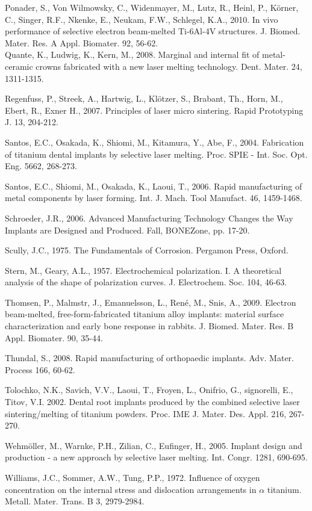 \documentclass[10pt]{article}
\begin{document}
Ponader, S., Von Wilmowsky, C., Widenmayer, M., Lutz, R., Heinl, P., Körner, C., Singer, R.F., Nkenke, E., Neukam, F.W., Schlegel, K.A., 2010. In vivo performance of selective electron beam-melted Ti-6Al-4V structures. J. Biomed. Mater. Res. A Appl. Biomater. 92, 56-62.\\
Quante, K., Ludwig, K., Kern, M., 2008. Marginal and internal fit of metal-ceramic crowns fabricated with a new laser melting technology. Dent. Mater. 24, 1311-1315.

Regenfuss, P., Streek, A., Hartwig, L., Klötzer, S., Brabant, Th., Horn, M., Ebert, R., Exner H., 2007. Principles of laser micro sintering. Rapid Prototyping J. 13, 204-212.

Santos, E.C., Osakada, K., Shiomi, M., Kitamura, Y., Abe, F., 2004. Fabrication of titanium dental implants by selective laser melting. Proc. SPIE - Int. Soc. Opt. Eng. 5662, 268-273.

Santos, E.C., Shiomi, M., Osakada, K., Laoui, T., 2006. Rapid manufacturing of metal components by laser forming. Int. J. Mach. Tool Manufact. 46, 1459-1468.

Schroeder, J.R., 2006. Advanced Manufacturing Technology Changes the Way Implants are Designed and Produced. Fall, BONEZone, pp. 17-20.

Scully, J.C., 1975. The Fundamentals of Corrosion. Pergamon Press, Oxford.

Stern, M., Geary, A.L., 1957. Electrochemical polarization. I. A theoretical analysis of the shape of polarization curves. J. Electrochem. Soc. 104, 46-63.

Thomsen, P., Malmstr, J., Emanuelsson, L., René, M., Snis, A., 2009. Electron beam-melted, free-form-fabricated titanium alloy implants: material surface characterization and early bone response in rabbits. J. Biomed. Mater. Res. B Appl. Biomater. 90, 35-44.

Thundal, S., 2008. Rapid manufacturing of orthopaedic implants. Adv. Mater. Process 166, 60-62.

Tolochko, N.K., Savich, V.V., Laoui, T., Froyen, L., Onifrio, G., signorelli, E., Titov, V.I. 2002. Dental root implants produced by the combined selective laser sintering/melting of titanium powders. Proc. IME J. Mater. Des. Appl. 216, 267-270.

Wehmöller, M., Warnke, P.H., Zilian, C., Eufinger, H., 2005. Implant design and production - a new approach by selective laser melting. Int. Congr. 1281, 690-695.

Williams, J.C., Sommer, A.W., Tung, P.P., 1972. Influence of oxygen concentration on the internal stress and dislocation arrangements in $\alpha$ titanium. Metall. Mater. Trans. B 3, 2979-2984.
\end{document}
